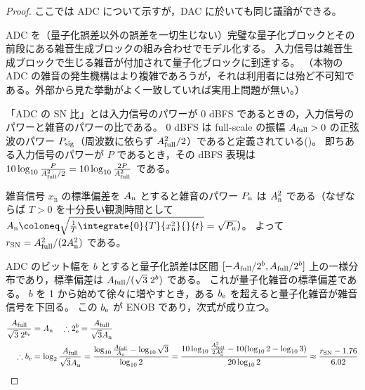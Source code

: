         \begin{proof}
            \quad\par
            ここでは ADC について示すが，DAC に於いても同じ議論ができる。\par
            ADC を（量子化誤差以外の誤差を一切生じない）完璧な量子化ブロックとその前段にある雑音生成ブロックの組み合わせでモデル化する。
            入力信号は雑音生成ブロックで生じる雑音が付加されて量子化ブロックに到達する。
            （本物の ADC の雑音の発生機構はより複雑であろうが，それは利用者には殆ど不可知である。外部から見た挙動がよく一致していれば実用上問題が無い。）
            \par
            「ADC の SN 比」とは入力信号のパワーが 0 dBFS であるときの，入力信号のパワーと雑音のパワーの比である。
            0 dBFS は full-scale の振幅 $A_\text{full}>0$ の正弦波のパワー $P_\text{sig}$（周波数に依らず $A_\text{full}^2/2$）であると定義されている(\cite{dBFS})。
            即ちある入力信号のパワーが $P$ であるとき，その dBFS 表現は $10\log_{10} \frac{P}{A_\text{full}^2/2} = 10\log_{10} \frac{2P}{A_\text{full}^2}$ である。
            \par
            雑音信号 $x_\text{n}$ の標準偏差を $A_\text{n}$ とすると雑音のパワー $P_\text{n}$ は $A_\text{n}^2$ である（なぜならば $T>0$ を十分長い観測時間として $\An\coloneq\sqrt{\frac{1}{T}\integrate{0}{T}{x_\text{n}^2}{}{t}} = \sqrt{\Pn}$）。
            よって $r_\text{SN} = A_\text{full}^2/(2A_\text{n}^2)$ である。
            \par
            ADC のビット幅を $b$ とすると量子化誤差は区間 $[-A_\text{full}/2^b,A_\text{full}/2^b]$ 上の一様分布であり，標準偏差は $A_\text{full}/(\sqrt{3}\;2^b)$ である。
            これが量子化雑音の標準偏差である。
            $b$ を 1 から始めて徐々に増やすとき，ある $b_\text{e}$ を超えると量子化雑音が雑音信号を下回る。
            この $b_\text{e}$ が ENOB であり，次式が成り立つ。
            \begin{align*}
                \frac{A_\text{full}}{\sqrt{3}\;2^{b_\text{e}}} &= A_\text{n} \quad \therefore 2^b_\text{e} = \frac{A_\text{full}}{\sqrt{3}A_\text{n}} \\
                \therefore b_\text{e} &= \log_2 \frac{A_\text{full}}{\sqrt{3}A_\text{n}} = \frac{\log_{10}\frac{A_\text{full}}{A_\text{n}} - \log_{10}\sqrt{3}}{\log_{10} 2} = \frac{10\log_{10}\frac{A_\text{full}^2}{2A_\text{n}^2} - 10(\log_{10}2 - \log_{10}3)}{20\log_{10} 2} \approx \frac{r_\text{SN} - 1.76}{6.02}
            \end{align*}
        \end{proof}